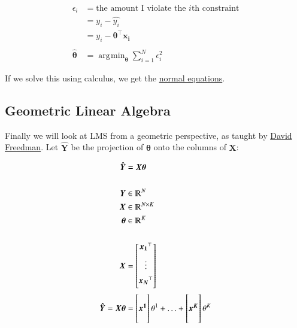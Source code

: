 \documentclass{article}
\DeclareMathOperator*{\argmin}{\arg\!\min}
\begin{document}
\begin{align*}
    \epsilon_i & = \text{the amount I violate the $i$th constraint} \\
    & = y_i - \hat{y_i} \\
    & = y_i - \boldsymbol{\theta}^{\top} \boldsymbol{x_i} \\
    \\
    \boldsymbol{\hat{\theta}} &= \argmin_{\boldsymbol{\theta}} \sum^N_{i=1} \epsilon_i^2
\end{align*}

If we solve this using calculus, we get the \hyperlink{normal}{normal equations}.



\subsection{Geometric Linear Algebra}
Finally we will look at LMS from a geometric perspective, as taught by \href{http://www.stat.berkeley.edu/~freedman/}{David Freedman}. Let $\boldsymbol{\hat{Y}}$ be the projection of $\boldsymbol{\theta}$ onto the columns of $\boldsymbol{X}$:

\begin{align*}
    \boldsymbol{\hat{Y}} & = \boldsymbol{X} \boldsymbol{\theta} \\
    \\
    \boldsymbol{Y} & \in \varmathbb{R}^N \\
    \boldsymbol{X} & \in \varmathbb{R}^{N \times K} \\
    \boldsymbol{\theta} & \in \varmathbb{R}^K \\
    \\ 
    \boldsymbol{X} & =  \begin{bmatrix}
\boldsymbol{x_1}^{\top} \\[0.5em]
\vdots \\[0.5em]
\boldsymbol{x_N}^{\top} \\[0.5em]
\end{bmatrix} \\
    \boldsymbol{\hat{Y}}  = \boldsymbol{X} \boldsymbol{\theta} & = \begin{bmatrix}
    \\
    \boldsymbol{x^1}\\
    \\
    \end{bmatrix} \theta^1 + \hdots + \begin{bmatrix}
    \\
    \boldsymbol{x^K}\\
    \\
    \end{bmatrix} \theta^K \\
\end{align*}
\end{document}
